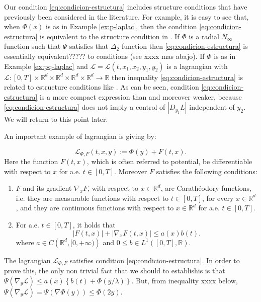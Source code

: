 \documentclass[twoside]{article}
\makeatletter
\theoremstyle{remark}
\newcommand{\labitem}[2]{%
\def\@itemlabel{\textbf{#1}}
\item
\def\@currentlabel{#1}\label{#2}}
\newcommand{\rr}{\mathbb{R}}
\renewcommand{\leq}{\leqslant}
\newcounter{example}[section]
\makeatother
\begin{document}
Our condition \eqref{eq:condicion-estructura} includes structure conditions that have previously been considered in the literature. For example, it is easy to see that, when $\Phi(x)$ is as in Example \ref{ex:p-laplac}, then  the condition \eqref{eq:condicion-estructura}  is equivalent to the structure condition in  \cite[Th. 1.4]{mawhin2010critical}.  If $\Phi$ is a radial $N_{\infty}$ function such that $\Psi$ satisfies that $\Delta_2$ function  then \eqref{eq:condicion-estructura} is essentially equivalent????? to conditions  \cite[Eq. (2)-(4)]{ABGMS2015} (see xxxx mas abajo).   If $\Phi$ is as in Example \ref{ex:pq-laplac} and $\mathcal{L}=\mathcal{L}(t,x_1,x_2,y_1,y_2)$ is a lagrangian with $\mathcal{L}:[0,T]\times\rr^d\times\rr^d\times\rr^d\times\rr^d\to\rr$ then inequality \eqref{eq:condicion-estructura} is related to estructure conditions like
\cite[Lemma 3.1, Eq. (3.1)]{Tian2007192}. As can be seen, condition \eqref{eq:condicion-estructura} is a more compact expression than \cite[Lemma 3.1, Eq. (3.1)]{Tian2007192} and moreover   weaker, because  \eqref{eq:condicion-estructura} does not imply a control of
$|D_{y_1}L|$ independent of $y_2$.  We will return to this point later.


An important example of lagrangian  is giving by:

\begin{equation}\label{eq:lagrange_phi}
\mathcal{L}_{\Phi,F}(t,x,y):=\Phi(y)+F(t,x).
\end{equation}
Here the function $F(t,x)$, which is often referred to potential,  be differentiable with respect to $x$ for a.e. $t\in [0,T]$. Moreover $F$ satisfies the following conditions:
\begin{enumerate}
\labitem{(C)}{item:condicion_c} $F$ and its gradient $\nabla_x F$, with respect to $x\in\rr^d$,  are  Carath\'eodory functions, i.e. they are measurable functions with respect to $t\in [0,T]$, for every  $x\in\rr^d$, and they are continuous functions with  respect to  $x\in\rr^d$ for a.e. $t \in [0,T]$.
 \labitem{(A)}{item:condicion_a}  For   a.e. $t\in [0,T]$, it holds that
\begin{equation}
|F(t,x)| + |\nabla_x F(t,x)|  \leq a(x)b(t).
\end{equation}
where  $a\in C\left(\rr^d,[0,+\infty)\right)$ and $0\leq b\in L^1([0,T],\rr)$.
\end{enumerate}

The lagrangian $\mathcal{L}_{\Phi,F}$ satisfies condition  \eqref{eq:condicion-estructura}. In order to prove this, the only non trivial fact that we should to establishis is that $ \Psi(\nabla_{y}\mathcal{L})
\leq
a(x)\left\{b(t)+ \Phi\left({y}/{\lambda}\right)\right\}$. But, from inequality xxxx below, 
$\Psi(\nabla_{y}\mathcal{L})=\Psi\left(\nabla\Phi(y)\right)\leq \Phi(2y)$.
\end{document}
